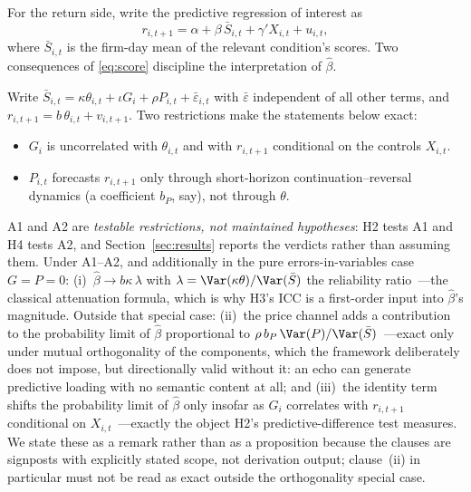 For the return side, write the predictive regression of interest as
\begin{equation}\label{eq:pred}
r_{i,t+1} = \alpha + \beta\, \bar{S}_{i,t} + \gamma' X_{i,t} + u_{i,t},
\end{equation}
where $\bar{S}_{i,t}$ is the firm-day mean of the relevant condition's scores. Two consequences of \eqref{eq:score} discipline the interpretation of $\hat\beta$.

\begin{remark}\label{prop:attenuation}
Write $\bar{S}_{i,t}=\kappa\theta_{i,t}+\iota G_i+\rho P_{i,t}+\bar\varepsilon_{i,t}$ with $\bar\varepsilon$ independent of all other terms, and $r_{i,t+1}=b\,\theta_{i,t}+v_{i,t+1}$. Two restrictions make the statements below exact:
\begin{itemize}[leftmargin=1.8em, itemsep=1pt, topsep=2pt]
\item[\textbf{A1.}] $G_i$ is uncorrelated with $\theta_{i,t}$ and with $r_{i,t+1}$ conditional on the controls $X_{i,t}$.
\item[\textbf{A2.}] $P_{i,t}$ forecasts $r_{i,t+1}$ only through short-horizon continuation--reversal dynamics (a coefficient $b_P$, say), not through $\theta$.
\end{itemize}
A1 and A2 are \emph{testable restrictions, not maintained hypotheses}: H2 tests A1 and H4 tests A2, and Section~\ref{sec:results} reports the verdicts rather than assuming them. Under A1--A2, and additionally in the pure errors-in-variables case $G=P=0$: (i)~$\hat\beta \to b\kappa\,\lambda$ with $\lambda=\Var(\kappa\theta)/\Var(\bar{S})$ the reliability ratio~---the classical attenuation formula, which is why H3's ICC is a first-order input into $\hat\beta$'s magnitude. Outside that special case: (ii)~the price channel adds a contribution to the probability limit of $\hat\beta$ proportional to $\rho\,b_P\,\Var(P)/\Var(\bar{S})$~---exact only under mutual orthogonality of the components, which the framework deliberately does not impose, but directionally valid without it: an echo can generate predictive loading with no semantic content at all; and (iii)~the identity term shifts the probability limit of $\hat\beta$ only insofar as $G_i$ correlates with $r_{i,t+1}$ conditional on $X_{i,t}$~---exactly the object H2's predictive-difference test measures. We state these as a remark rather than as a proposition because the clauses are signposts with explicitly stated scope, not derivation output; clause~(ii) in particular must not be read as exact outside the orthogonality special case.
\end{remark}

